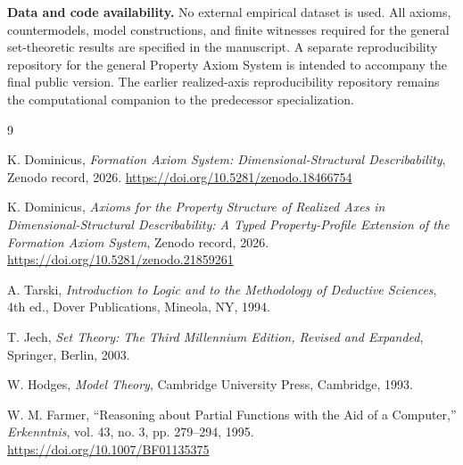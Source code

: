 \documentclass[11pt]{article}
\theoremstyle{definition}
\theoremstyle{remark}
\begin{document}
\noindent\textbf{Data and code availability.} No external empirical dataset is used.
All axioms, countermodels, model constructions, and finite witnesses required for the general set-theoretic results are specified in the manuscript.
A separate reproducibility repository for the general Property Axiom System is intended to accompany the final public version.
The earlier realized-axis reproducibility repository remains the computational companion to the predecessor specialization.

\begin{thebibliography}{9}

K. Dominicus,
\textit{Formation Axiom System: Dimensional-Structural Describability},
Zenodo record, 2026.
\url{https://doi.org/10.5281/zenodo.18466754}

K. Dominicus,
\textit{Axioms for the Property Structure of Realized Axes in Dimensional-Structural Describability: A Typed Property-Profile Extension of the Formation Axiom System},
Zenodo record, 2026.
\url{https://doi.org/10.5281/zenodo.21859261}

A. Tarski,
\textit{Introduction to Logic and to the Methodology of Deductive Sciences},
4th ed., Dover Publications, Mineola, NY, 1994.

T. Jech,
\textit{Set Theory: The Third Millennium Edition, Revised and Expanded},
Springer, Berlin, 2003.

W. Hodges,
\textit{Model Theory},
Cambridge University Press, Cambridge, 1993.

W. M. Farmer,
``Reasoning about Partial Functions with the Aid of a Computer,''
\textit{Erkenntnis}, vol. 43, no. 3, pp. 279--294, 1995.
\url{https://doi.org/10.1007/BF01135375}

\end{thebibliography}
\end{document}

